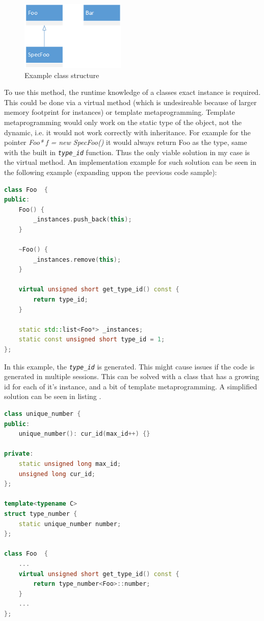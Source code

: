 \begin{figure}[!ht]
\centering
\includegraphics[width=50mm, keepaspectratio]{figures/simple_class.png}
\caption{Example class structure}
\label{fig:simple_class}
\end{figure}

To use this method, the runtime knowledge of a classes exact instance is
required. This could be done via a virtual method (which is undesireable
because of larger memory footprint for instances) or template metaprogramming.
Template metaprogramming would only work on the static type of the object, not
the dynamic, i.e. it would not work correctly with inheritance. For example for
the pointer \emph{Foo* f = new SpecFoo()} it would always return Foo as the
type, same with the built in \emph{\texttt{type\_id}} function. Thus the only
viable solution in my case is the virtual method. An implementation example for
such solution can be seen in the following example (expanding uppon the
previous code sample):

\begin{lstlisting}[frame=single,language=C++, label=listing:type_id,
caption=Type identifier for classes]
class Foo  {
public:
	Foo() {
		_instances.push_back(this);
	}
	
	~Foo() {
		_instances.remove(this);
	}
	
	virtual unsigned short get_type_id() const {
        return type_id;
    }
		
	static std::list<Foo*> _instances;
	static const unsigned short type_id = 1;
};
\end{lstlisting}

In this example, the \emph{\texttt{type\_id}} is generated. This might cause
issues if the code is generated in multiple sessions. This can be solved with a
class that has a growing id for each of it's instance, and a bit of template
metaprogramming. A simplified solution can be seen in listing
.

\begin{lstlisting}[frame=single,float=!ht,language=C++,
label=listing:unique_number, caption=Unique number generation for type
identifiers]
class unique_number { 
public:
	unique_number(): cur_id(max_id++) {}

private:
	static unsigned long max_id;
	unsigned long cur_id;
};

template<typename C>
struct type_number {
	static unique_number number;
};

class Foo  {
	...
	virtual unsigned short get_type_id() const {
        return type_number<Foo>::number;
    }
	...
};
\end{lstlisting}

